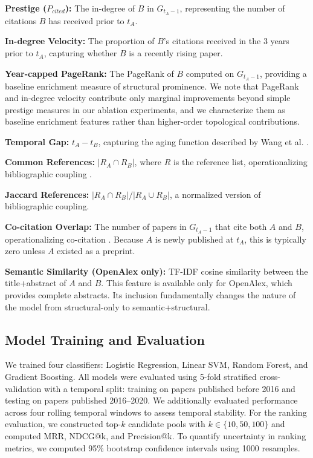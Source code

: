 \documentclass[11pt,a4paper]{article}
\begin{document}
\textbf{Prestige ($P_{cited}$):} The in-degree of $B$ in $G_{t_A-1}$, representing the number of citations $B$ has received prior to $t_A$.

\textbf{In-degree Velocity:} The proportion of $B$'s citations received in the 3 years prior to $t_A$, capturing whether $B$ is a recently rising paper.

\textbf{Year-capped PageRank:} The PageRank of $B$ computed on $G_{t_A-1}$, providing a baseline enrichment measure of structural prominence. We note that PageRank and in-degree velocity contribute only marginal improvements beyond simple prestige measures in our ablation experiments, and we characterize them as baseline enrichment features rather than higher-order topological contributions.

\textbf{Temporal Gap:} $t_A - t_B$, capturing the aging function described by Wang et al. \citep{wang2013quantifying}.

\textbf{Common References:} $|R_A \cap R_B|$, where $R$ is the reference list, operationalizing bibliographic coupling \citep{kessler1963bibliographic}.

\textbf{Jaccard References:} $|R_A \cap R_B| / |R_A \cup R_B|$, a normalized version of bibliographic coupling.

\textbf{Co-citation Overlap:} The number of papers in $G_{t_A-1}$ that cite both $A$ and $B$, operationalizing co-citation \citep{small1973co}. Because $A$ is newly published at $t_A$, this is typically zero unless $A$ existed as a preprint.

\textbf{Semantic Similarity (OpenAlex only):} TF-IDF cosine similarity between the title+abstract of $A$ and $B$. This feature is available only for OpenAlex, which provides complete abstracts. Its inclusion fundamentally changes the nature of the model from structural-only to semantic+structural.

\subsection{Model Training and Evaluation}
We trained four classifiers: Logistic Regression, Linear SVM, Random Forest, and Gradient Boosting. All models were evaluated using 5-fold stratified cross-validation with a temporal split: training on papers published before 2016 and testing on papers published 2016--2020. We additionally evaluated performance across four rolling temporal windows to assess temporal stability. For the ranking evaluation, we constructed top-$k$ candidate pools with $k \in \{10, 50, 100\}$ and computed MRR, NDCG@k, and Precision@k. To quantify uncertainty in ranking metrics, we computed 95\% bootstrap confidence intervals using 1000 resamples.
\end{document}
